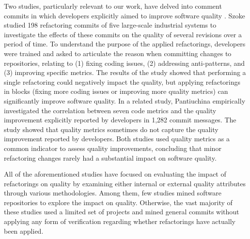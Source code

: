 Two studies, particularly relevant to our work, have delved into comment commits in which developers explicitly aimed to improve software quality \citep{szoke2014bulk,pantiuchina2018improving}. Szoke \etal \citep{szoke2014bulk} studied 198 refactoring commits of five large-scale industrial systems to investigate the effects of these commits on the quality of several revisions over a period of time. To understand the purpose of the applied refactorings, developers were trained and asked to articulate the reason when committing changes to repositories, relating to (1) fixing coding issues, (2) addressing anti-patterns, and (3) improving specific metrics. The results of the study showed that performing a single refactoring could negatively impact the quality, but applying refactorings in blocks (\eg fixing more coding issues or improving more quality metrics) can significantly improve software quality. In a related study, Pantiuchina \etal \citep{pantiuchina2018improving} empirically investigated the correlation between seven code metrics and the quality improvement explicitly reported by developers in 1,282 commit messages. The study showed that quality metrics sometimes do not capture the quality improvement reported by developers. Both studies used quality metrics as a common indicator to assess quality improvements, concluding that minor refactoring changes rarely had a substantial impact on software quality.

All of the aforementioned studies have focused on evaluating the impact of refactorings on quality by examining either internal or external quality attributes through various methodologies. Among them, few studies \citep{ratzinger2005improving, stroggylos2007refactoring, szoke2014bulk, bavota2015experimental, cedrim2016does, chavez2017does, pantiuchina2018improving, hamdi2021empirical,ouni2023impact,alomar2020developers,alomar2022refactoring,fakhoury2019improving,alomar2019impact} mined software repositories to explore the impact on quality. Otherwise, the vast majority of these studies %
used a limited set of projects and mined general commits without applying any form of verification regarding whether refactorings have actually been applied. 

